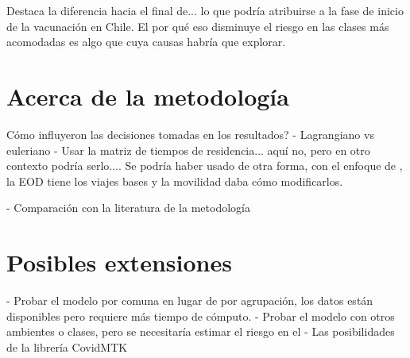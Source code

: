 Destaca la diferencia hacia el final de... lo que podría atribuirse a la fase de inicio de la vacunación en Chile. El por qué eso disminuye el riesgo en las clases más acomodadas es algo que cuya causas habría que explorar.

 
\section{Acerca de la metodología}

Cómo influyeron las decisiones tomadas en los resultados? 
- Lagrangiano vs euleriano 
- Usar la matriz de tiempos de residencia... aquí no, pero en otro contexto podría serlo.... Se podría haber usado de otra forma, con el enfoque de \cite{Chang2021}, la EOD tiene los viajes bases y la movilidad daba cómo modificarlos.

- Comparación con la literatura de la metodología 

\section{Posibles extensiones}
- Probar el modelo por comuna en lugar de por agrupación, los datos están disponibles pero requiere más tiempo de cómputo.
- Probar el modelo con otros ambientes o clases, pero se necesitaría estimar el riesgo en el 
- Las posibilidades de la librería CovidMTK 